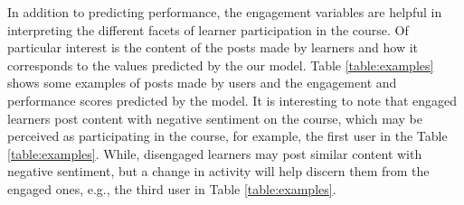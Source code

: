 In addition to predicting performance, the engagement variables are helpful in interpreting the different facets of learner participation in the course. Of particular interest is the content of the posts made by learners and how it corresponds to the values predicted by the our model. Table \ref{table:examples} shows some examples of posts made by users and the engagement and performance scores predicted by the model. It is interesting to note that engaged learners post content with negative sentiment on the course, which may be perceived as participating in the course, for example, the first user in the Table \ref{table:examples}. While, disengaged learners may post similar content with negative sentiment, but a change in activity will help discern them from the engaged ones, e.g., the third user in Table \ref{table:examples}. 


